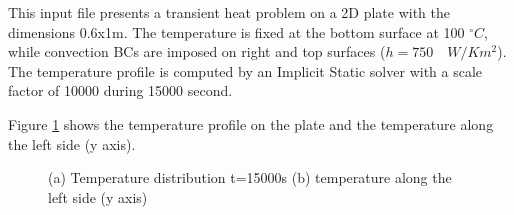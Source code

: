 \documentclass[oneside,11pt,times]{book}
\begin{document}
This input file presents a transient heat problem on a 2D plate with the dimensions 0.6x1m. The temperature is fixed at the bottom surface at 100 $^{\circ}C$, while convection BCs are imposed on right and top surfaces ($h=750\quad W/Km^2$). The temperature profile is computed by an Implicit Static solver with a scale factor of 10000 during 15000 second.

\medbreak
Figure \ref{ex16} shows the temperature profile on the plate and the temperature along the left side (y axis).

\begin{figure}[H]
  \begin{center}
      \quad
    \caption{(a) Temperature distribution t=15000s (b) temperature along the left side (y axis)}
    \label{ex16}
  \end{center}
\end{figure}


\newpage
\end{document}
